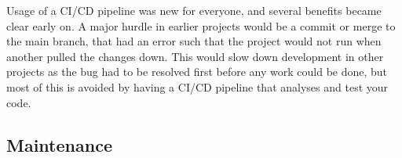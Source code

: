 \documentclass[report/main.tex]{subfiles}
\begin{document}
            Usage of a CI/CD pipeline was new for everyone, and several benefits became clear early on. A major hurdle in earlier projects would be a commit or merge to the main branch, that had an error such that the project would not run when another pulled the changes down. This would slow down development in other projects as the bug had to be resolved first before any work could be done, but most of this is avoided by having a CI/CD pipeline that analyses and test your code.
        
        \subsection{Maintenance}
        
        
\end{document}
